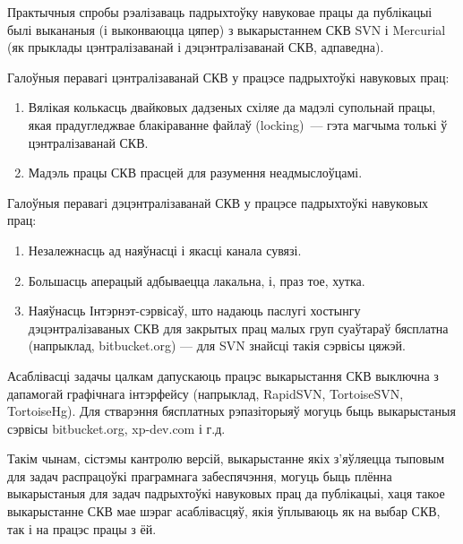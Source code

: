 \documentclass[10pt, a5paper]{article}
\begin{document}
Практычныя спробы рэалізаваць падрыхтоўку навуковае працы да публікацыі былі выкананыя (і выконваюцца цяпер) з выкарыстаннем СКВ SVN і Mercurial (як прыклады цэнтралізаванай і дэцэнтралізаванай СКВ, адпаведна).

Галоўныя перавагі цэнтралізаванай СКВ у працэсе падрыхтоўкі навуковых прац:

\begin{enumerate}
  \item Вялікая колькасць двайковых дадзеных схіляе да мадэлі супольнай працы, якая прадугледжвае блакіраванне файлаў \linebreak (locking)~--- гэта магчыма толькі ў цэнтралізаванай СКВ.
  \item Мадэль працы СКВ прасцей для разумення неадмыслоўцамі.
\end{enumerate}

Галоўныя перавагі дэцэнтралізаванай СКВ у працэсе падрыхтоўкі навуковых прац:

\begin{enumerate}
  \item Незалежнасць ад наяўнасці і якасці канала сувязі.
  \item Большасць аперацый адбываецца лакальна, і, праз тое, хутка.
  \item Наяўнасць Інтэрнэт-сэрвісаў, што надаюць паслугі хостынгу дэцэнтралізаваных СКВ для закрытых прац малых груп суаўтараў бясплатна (напрыклад, bitbucket.org) --- для SVN знайсці такія сэрвісы цяжэй.
\end{enumerate}

Асаблівасці задачы цалкам дапускаюць працэс выкарыстання СКВ выключна з дапамогай графічнага інтэрфейсу (напрыклад, RapidSVN, TortoiseSVN, TortoiseHg). Для стварэння бясплатных рэпазіторыяў могуць быць выкарыстаныя сэрвісы bitbucket.org, xp-dev.com і г.д.

Такім чынам, сістэмы кантролю версій, выкарыстанне якіх з'яўляецца тыповым для задач распрацоўкі праграмнага забеспячэння, могуць быць плённа выкарыстаныя для задач падрыхтоўкі навуковых прац да публікацыі, хаця такое выкарыстанне СКВ мае шэраг асаблівасцяў, якія ўплываюць як на выбар СКВ, так і на працэс працы з ёй.
\end{document}
